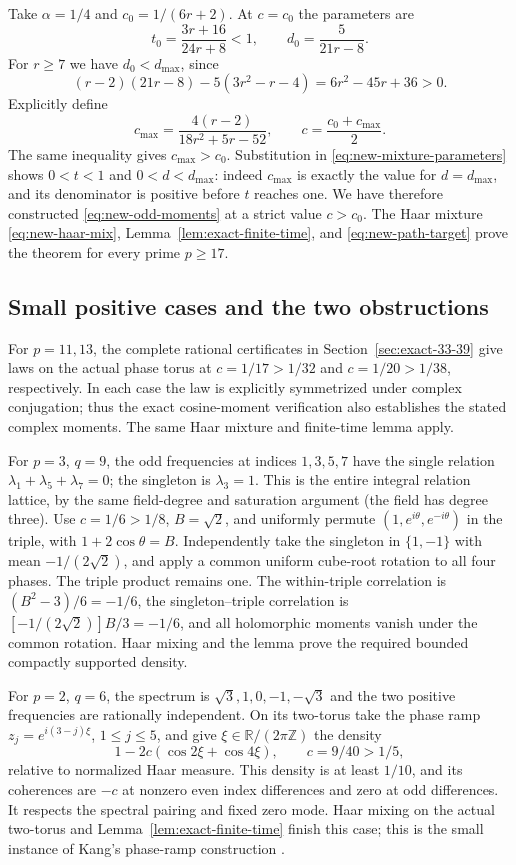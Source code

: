 \documentclass[11pt,a4paper]{article}
\theoremstyle{definition}\newtheorem{definition}[theorem]{Definition}
\theoremstyle{remark}\newtheorem{remark}[theorem]{Remark}
\begin{document}
Take $\alpha=1/4$ and $c_0=1/(6r+2)$. At $c=c_0$ the parameters are
\[
 t_0=\frac{3r+16}{24r+8}<1,\qquad d_0=\frac5{21r-8}.
\]
For $r\geq7$ we have $d_0<d_{\max}$, since
\[
 (r-2)(21r-8)-5(3r^2-r-4)=6r^2-45r+36>0.
\]
Explicitly define
\begin{equation}\label{eq:new-explicit-c}
 c_{\max}=\frac{4(r-2)}{18r^2+5r-52},\qquad
 c=\frac{c_0+c_{\max}}2.
\end{equation}
The same inequality gives $c_{\max}>c_0$.
Substitution in \eqref{eq:new-mixture-parameters} shows $0<t<1$ and
$0<d<d_{\max}$: indeed $c_{\max}$ is exactly the value for
$d=d_{\max}$, and its denominator is positive before $t$ reaches one.
We have therefore constructed \eqref{eq:new-odd-moments} at a strict
value $c>c_0$. The Haar mixture \eqref{eq:new-haar-mix},
Lemma~\ref{lem:exact-finite-time}, and
\eqref{eq:new-path-target} prove the theorem for every prime $p\geq17$.

\subsection{Small positive cases and the two obstructions}
For $p=11,13$, the complete rational certificates in
Section~\ref{sec:exact-33-39} give laws on the actual phase torus at
$c=1/17>1/32$ and $c=1/20>1/38$, respectively. In each case the law
is explicitly symmetrized under complex conjugation; thus the exact
cosine-moment verification also establishes the stated complex
moments. The same Haar mixture and finite-time lemma apply.

For $p=3$, $q=9$, the odd frequencies at indices $1,3,5,7$ have the
single relation $\lambda_1+\lambda_5+\lambda_7=0$; the singleton is
$\lambda_3=1$. This is the entire integral relation lattice, by the
same field-degree and saturation argument (the field has degree three).
Use $c=1/6>1/8$, $B=\sqrt2$, and uniformly permute
$(1,e^{i\theta},e^{-i\theta})$ in the triple, with
$1+2\cos\theta=B$. Independently take the singleton in $\{1,-1\}$
with mean $-1/(2\sqrt2)$, and apply a common uniform cube-root rotation
to all four phases. The triple product remains one. The within-triple
correlation is $(B^2-3)/6=-1/6$, the singleton--triple correlation is
$[-1/(2\sqrt2)]B/3=-1/6$, and all holomorphic moments vanish under
the common rotation. Haar mixing and the lemma prove the required
bounded compactly supported density.

For $p=2$, $q=6$, the spectrum is $\sqrt3,1,0,-1,-\sqrt3$ and the
two positive frequencies are rationally independent. On its two-torus
take the phase ramp $z_j=e^{i(3-j)\xi}$, $1\leq j\leq5$, and give
$\xi\in\mathbb R/(2\pi\mathbb Z)$ the density
\[
 1-2c(\cos2\xi+\cos4\xi),\qquad c=9/40>1/5,
\]
relative to normalized Haar measure. This density is at least $1/10$,
and its coherences are $-c$ at nonzero even index differences and zero
at odd differences. It respects the spectral pairing and fixed zero
mode. Haar mixing on the actual two-torus and
Lemma~\ref{lem:exact-finite-time} finish this case; this is the small
instance of Kang's phase-ramp construction \cite{Kang2026}.
\end{document}
